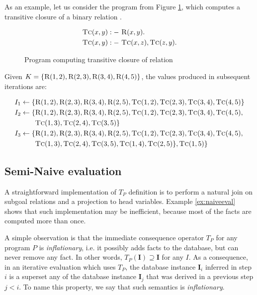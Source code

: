 \begin{exmp}
As an example, let us consider the program from Figure \ref{ex:tcofr}, which computes a transitive closure of a binary relation .
\begin{figure}[!htbp]
\begin{align*}
\textsc{Tc}(x, y) &:-~ \textsc{R}(x, y).\\
\textsc{Tc}(x, y) &:-~ \textsc{Tc}(x, z), \textsc{Tc}(z, y).
\end{align*}
\caption{Program computing transitive closure of relation \label{ex:tcofr}}
\end{figure}

Given $K = \{\textsc{R}(1, 2), \textsc{R}(2, 3), \textsc{R}(3, 4), \textsc{R}(4, 5)\}$, the values produced in subsequent iterations are:

\begin{align*}
I_1 \leftarrow \{&\textsc{R}(1, 2), \textsc{R}(2, 3), \textsc{R}(3, 4), \textsc{R}(2, 5), \textsc{Tc}(1, 2), \textsc{Tc}(2, 3), \textsc{Tc}(3, 4), \textsc{Tc}(4, 5)\}\\
I_2 \leftarrow \{&\textsc{R}(1, 2), \textsc{R}(2, 3), \textsc{R}(3, 4), \textsc{R}(2, 5), \textsc{Tc}(1, 2), \textsc{Tc}(2, 3), \textsc{Tc}(3, 4), \textsc{Tc}(4, 5), \\
&\textsc{Tc}(1, 3), \textsc{Tc}(2, 4), \textsc{Tc}(3, 5)\}\\
I_3 \leftarrow \{&\textsc{R}(1, 2), \textsc{R}(2, 3), \textsc{R}(3, 4), \textsc{R}(2, 5), \textsc{Tc}(1, 2), \textsc{Tc}(2, 3), \textsc{Tc}(3, 4), \textsc{Tc}(4, 5),\\
& \textsc{Tc}(1, 3), \textsc{Tc}(2, 4), \textsc{Tc}(3, 5), \textsc{Tc}(1, 4), \textsc{Tc}(2, 5)\}, \textsc{Tc}(1, 5)\}\\
\end{align*}
\label{ex:naiveeval}
\end{exmp}

\subsection{Semi-Naive evaluation}\label{ss:seminaiveevaldatalog}
A straightforward implementation of $T_P$ definition is to perform a natural join on subgoal relations and a projection to head variables. Example \ref{ex:naiveeval} shows that such implementation may be inefficient, because most of the facts are computed more than once.

A simple observation is that the immediate consequence operator $T_P$ for any program $P$ is \emph{inflationary}, i.e. it possibly adds facts to the database, but can never remove any fact. In other words, $T_P(\textbf{I}) \supseteq \textbf{I}$ for any $I$. As a consequence, in an iterative evaluation which uses $T_P$, the database instance $\textbf{I}_i$ inferred in step $i$ is a superset any of the database instance $\textbf{I}_j$ that was derived in a previous step $j < i$. To name this property, we say that such semantics is \emph{inflationary}.

